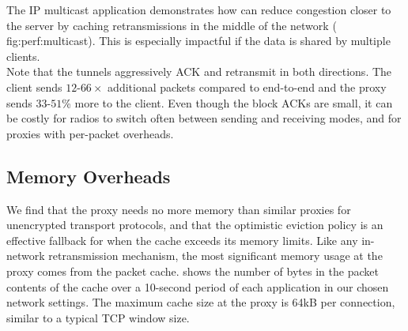The IP multicast application demonstrates how \Sys can reduce congestion closer
to the server by caching retransmissions in the middle of the network (\Cref
{fig:perf:multicast}). This is especially impactful if the data is shared by
multiple clients.\\

\noindent Note that the tunnels aggressively ACK and retransmit in both
directions. The client sends $12$-$66\!\times$ additional packets compared to
end-to-end and the proxy sends $33$-$51$\% more to the client. Even though the
block ACKs are small, it can be costly for radios to switch often between
sending and receiving modes, and for proxies with per-packet overheads.





\subsection{Memory Overheads}
\label{sec:evaluation:memory}



We find that the \Sys proxy needs no more memory
than similar proxies for unencrypted transport protocols, and that the optimistic
eviction policy is an effective fallback for when the cache exceeds its memory limits.
Like any in-network retransmission mechanism,
the most significant memory usage at the proxy comes from the packet
cache.  shows the number of bytes in the packet contents of
the cache over a 10-second period of each application in our chosen
network settings. The maximum cache size
at the \Sys proxy is 64kB per connection, similar to a typical TCP window size.


